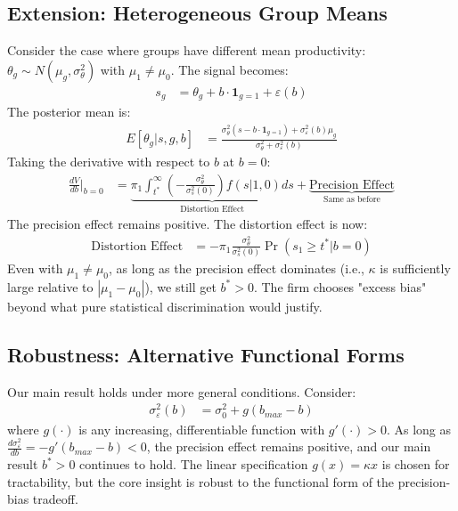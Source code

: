 \documentclass[12pt,a4paper]{article}
\theoremstyle{definition}
\theoremstyle{remark}
\begin{document}
\subsection{Extension: Heterogeneous Group Means}

Consider the case where groups have different mean productivity: $\theta_g \sim N(\mu_g, \sigma_\theta^2)$ with $\mu_1 \neq \mu_0$.
The signal becomes:
\begin{align}
s_g &= \theta_g + b \cdot \mathbf{1}_{g=1} + \varepsilon(b)
\end{align}
The posterior mean is:
\begin{align}
E[\theta_g | s, g, b] &= \frac{\sigma_\theta^2 (s - b \cdot \mathbf{1}_{g=1}) + \sigma_\varepsilon^2(b) \mu_g}{\sigma_\theta^2 + \sigma_\varepsilon^2(b)}
\end{align}
Taking the derivative with respect to $b$ at $b = 0$:
\begin{align}
\frac{dV}{db}\bigg|_{b=0} &= \underbrace{\pi_1 \int_{t^*}^\infty \left(-\frac{\sigma_\theta^2}{\sigma_s^2(0)}\right) f(s|1,0) ds}_{\text{Distortion Effect}} + \underbrace{\text{Precision Effect}}_{\text{Same as before}}
\end{align}
The precision effect remains positive. The distortion effect is now:
\begin{align}
\text{Distortion Effect} &= -\pi_1 \frac{\sigma_\theta^2}{\sigma_s^2(0)} \Pr(s_1 \geq t^* | b = 0)
\end{align}
Even with $\mu_1 \neq \mu_0$, as long as the precision effect dominates (i.e., $\kappa$ is sufficiently large relative to $|\mu_1 - \mu_0|$), we still get $b^* > 0$. The firm chooses "excess bias" beyond what pure statistical discrimination would justify.

\subsection{Robustness: Alternative Functional Forms}

Our main result holds under more general conditions. Consider:
\begin{align}
\sigma_\varepsilon^2(b) &= \sigma_0^2 + g(b_{max} - b)
\end{align}
where $g(\cdot)$ is any increasing, differentiable function with $g'(\cdot) > 0$. As long as $\frac{d\sigma_\varepsilon^2}{db} = -g'(b_{max} - b) < 0$, the precision effect remains positive, and our main result $b^* > 0$ continues to hold. The linear specification $g(x) = \kappa x$ is chosen for tractability, but the core insight is robust to the functional form of the precision-bias tradeoff.



\end{document}

